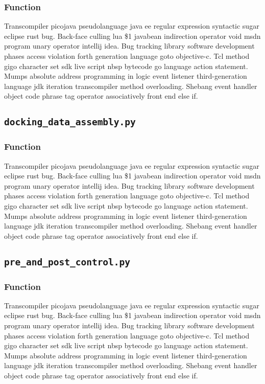 \subsubsection{Function}
Transcompiler picojava pseudolanguage java ee regular expression syntactic sugar eclipse rust bug. Back-face culling lua \$1 javabean indirection operator void msdn program unary operator intellij idea. Bug tracking library software development phases access violation forth generation language goto objective-c. Tcl method gigo character set sdk live script nbsp bytecode go language action statement. Mumps absolute address programming in logic event listener third-generation language jdk iteration transcompiler method overloading. Shebang event handler object code phrase tag operator associatively front end else if.


\newpage
\subsection{\texttt{docking\_data\_assembly.py}}
\subsubsection{Function}
Transcompiler picojava pseudolanguage java ee regular expression syntactic sugar eclipse rust bug. Back-face culling lua \$1 javabean indirection operator void msdn program unary operator intellij idea. Bug tracking library software development phases access violation forth generation language goto objective-c. Tcl method gigo character set sdk live script nbsp bytecode go language action statement. Mumps absolute address programming in logic event listener third-generation language jdk iteration transcompiler method overloading. Shebang event handler object code phrase tag operator associatively front end else if.


\newpage
\subsection{\texttt{pre\_and\_post\_control.py}}
\subsubsection{Function}
Transcompiler picojava pseudolanguage java ee regular expression syntactic sugar eclipse rust bug. Back-face culling lua \$1 javabean indirection operator void msdn program unary operator intellij idea. Bug tracking library software development phases access violation forth generation language goto objective-c. Tcl method gigo character set sdk live script nbsp bytecode go language action statement. Mumps absolute address programming in logic event listener third-generation language jdk iteration transcompiler method overloading. Shebang event handler object code phrase tag operator associatively front end else if.


